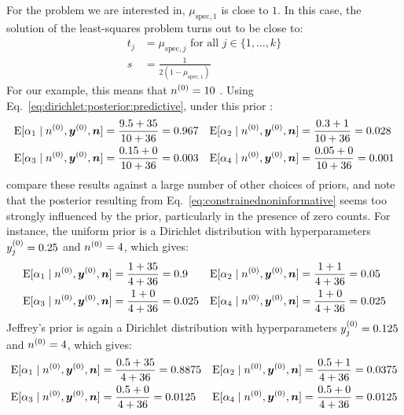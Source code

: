 For the problem we are interested in, $\mu_{\text{spec},1}$ is close to $1$.
In this case, the solution of the least-squares problem turns out to be close to:
\begin{equation}
 \label{eq:constrainednoninformative}
 \begin{split}
  t_j&=\mu_{\text{spec},j} \text{ for all $j\in\{1,\dots,k\}$} \\
  s&=\frac{1}{2(1-\mu_{\text{spec},1})}
 \end{split}
\end{equation}
For our example, this means that $n^{(0)}=10$ \parencite[p.~400, \S 3]{2011:kelly:atwood}.
Using Eq.~\eqref{eq:dirichlet:posterior:predictive}, under this prior \parencite[p.~401, \S 3.1]{2011:kelly:atwood}:
\begin{align*}
  \operatorname{E}[\alpha_1\mid n^{(0)},{\bm y}^{(0)},{\bm n}] &= \frac{9.5 + 35}{10 + 36} = 0.967
  &
  \operatorname{E}[\alpha_2\mid n^{(0)},{\bm y}^{(0)},{\bm n}] &= \frac{0.3  + 1}{10 + 36} = 0.028
  \\
  \operatorname{E}[\alpha_3\mid n^{(0)},{\bm y}^{(0)},{\bm n}] &= \frac{0.15 + 0}{10 + 36} = 0.003
  &
  \operatorname{E}[\alpha_4\mid n^{(0)},{\bm y}^{(0)},{\bm n}] &= \frac{0.05 + 0}{10 + 36} = 0.001
\end{align*}
\textcite[p.~402, \S 4]{2011:kelly:atwood}
compare these results against a large number of other choices of priors,
and note that the posterior resulting from Eq.~\eqref{eq:constrainednoninformative}
seems too strongly influenced by the prior, particularly in the presence of zero counts.
For instance, the uniform prior is a Dirichlet distribution with hyperparameters
$y^{(0)}_j=0.25$ and $n^{(0)}=4$, which gives:
\begin{align*}
  \operatorname{E}[\alpha_1\mid n^{(0)},{\bm y}^{(0)},{\bm n}] &= \frac{1+35}{4+36} = 0.9
  &
  \operatorname{E}[\alpha_2\mid n^{(0)},{\bm y}^{(0)},{\bm n}] &= \frac{1+1}{4+36} = 0.05
  \\
  \operatorname{E}[\alpha_3\mid n^{(0)},{\bm y}^{(0)},{\bm n}] &= \frac{1+0}{4+36} = 0.025
  &
  \operatorname{E}[\alpha_4\mid n^{(0)},{\bm y}^{(0)},{\bm n}] &= \frac{1+0}{4+36} = 0.025
\end{align*}
Jeffrey's prior is again a Dirichlet distribution with hyperparameters
$y^{(0)}_j=0.125$ and $n^{(0)}=4$, which gives:
\begin{align*}
  \operatorname{E}[\alpha_1\mid n^{(0)},{\bm y}^{(0)},{\bm n}] &= \frac{0.5 + 35}{4+36} = 0.8875
  &
  \operatorname{E}[\alpha_2\mid n^{(0)},{\bm y}^{(0)},{\bm n}] &= \frac{0.5 + 1}{4+36} = 0.0375
  \\
  \operatorname{E}[\alpha_3\mid n^{(0)},{\bm y}^{(0)},{\bm n}] &= \frac{0.5 + 0}{4+36} = 0.0125
  &
  \operatorname{E}[\alpha_4\mid n^{(0)},{\bm y}^{(0)},{\bm n}] &= \frac{0.5 + 0}{4+36} = 0.0125
\end{align*}


